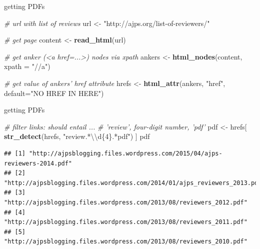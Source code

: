 \documentclass[ignorenonframetext,]{beamer}
\newenvironment{Shaded}{\begin{snugshade}}{\end{snugshade}}
\newcommand{\KeywordTok}[1]{\textcolor[rgb]{0.13,0.29,0.53}{\textbf{{#1}}}}
\newcommand{\DataTypeTok}[1]{\textcolor[rgb]{0.13,0.29,0.53}{{#1}}}
\newcommand{\CharTok}[1]{\textcolor[rgb]{0.31,0.60,0.02}{{#1}}}
\newcommand{\StringTok}[1]{\textcolor[rgb]{0.31,0.60,0.02}{{#1}}}
\newcommand{\CommentTok}[1]{\textcolor[rgb]{0.56,0.35,0.01}{\textit{{#1}}}}
\newcommand{\NormalTok}[1]{{#1}}
\begin{document}
\begin{frame}[fragile]{getting PDFs}

\begin{Shaded}
\begin{Highlighting}[]
\CommentTok{# url with list of reviews}
\NormalTok{url <-}\StringTok{ "http://ajps.org/list-of-reviewers/"}

\CommentTok{# get page}
\NormalTok{content <-}\StringTok{ }\KeywordTok{read_html}\NormalTok{(url)}

\CommentTok{# get anker (<a href=...>) nodes via xpath}
\NormalTok{ankers  <-}\StringTok{ }\KeywordTok{html_nodes}\NormalTok{(content, }\DataTypeTok{xpath =} \StringTok{"//a"}\NormalTok{)}

\CommentTok{# get value of ankers' href attribute}
\NormalTok{hrefs   <-}\StringTok{ }\KeywordTok{html_attr}\NormalTok{(ankers, }\StringTok{"href"}\NormalTok{, }
                     \DataTypeTok{default=}\StringTok{"NO HREF IN HERE"}\NormalTok{)}
\end{Highlighting}
\end{Shaded}

\end{frame}

\begin{frame}[fragile]{getting PDFs}

\begin{Shaded}
\begin{Highlighting}[]
\CommentTok{# filter links: should entail ... }
\CommentTok{# 'review', four-digit number, 'pdf'}
\NormalTok{pdf <-}\StringTok{ }\NormalTok{hrefs[ }\KeywordTok{str_detect}\NormalTok{(hrefs, }\StringTok{"review.*}\CharTok{\textbackslash{}\textbackslash{}}\StringTok{d\{4\}.*pdf"}\NormalTok{) ]}
\NormalTok{pdf}
\end{Highlighting}
\end{Shaded}

\begin{verbatim}
## [1] "http://ajpsblogging.files.wordpress.com/2015/04/ajps-reviewers-2014.pdf"
## [2] "http://ajpsblogging.files.wordpress.com/2014/01/ajps_reviewers_2013.pdf"
## [3] "http://ajpsblogging.files.wordpress.com/2013/08/reviewers_2012.pdf"     
## [4] "http://ajpsblogging.files.wordpress.com/2013/08/reviewers_2011.pdf"     
## [5] "http://ajpsblogging.files.wordpress.com/2013/08/reviewers_2010.pdf"
\end{verbatim}

\end{frame}
\end{document}
